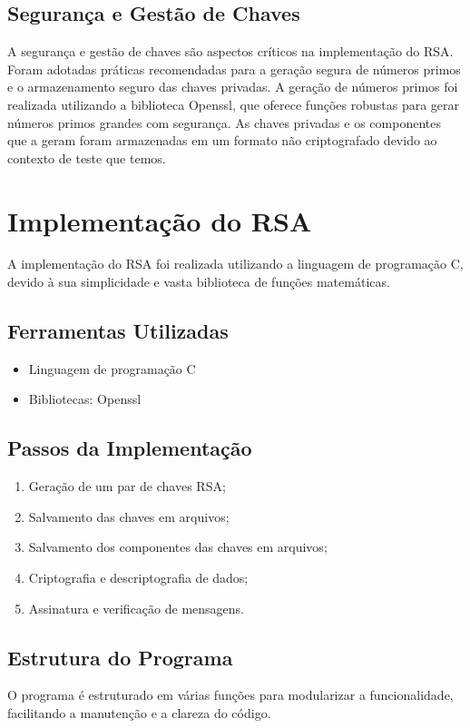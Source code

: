\documentclass[a4paper,12pt]{article}
\begin{document}
\subsection*{Segurança e Gestão de Chaves}
A segurança e gestão de chaves são aspectos críticos na implementação do RSA. Foram adotadas práticas recomendadas para a geração segura de números primos e o armazenamento seguro das chaves privadas. A geração de números primos foi realizada utilizando a biblioteca Openssl, que oferece funções robustas para gerar números primos grandes com segurança. As chaves privadas e os componentes que a geram foram armazenadas em um formato não criptografado devido ao contexto de teste que temos.

\section*{Implementação do RSA}
A implementação do RSA foi realizada utilizando a linguagem de programação C, devido à sua simplicidade e vasta biblioteca de funções matemáticas.

\subsection*{Ferramentas Utilizadas}
\begin{itemize}
    \item Linguagem de programação C
    \item Bibliotecas: Openssl
\end{itemize}

\subsection*{Passos da Implementação}
\begin{enumerate}
    \item Geração de um par de chaves RSA;
    \item Salvamento das chaves em arquivos;
    \item Salvamento dos componentes das chaves em arquivos;
    \item Criptografia e descriptografia de dados;
    \item Assinatura e verificação de mensagens.
\end{enumerate}

\subsection*{Estrutura do Programa}
O programa é estruturado em várias funções para modularizar a funcionalidade, facilitando a manutenção e a clareza do código.
\end{document}
